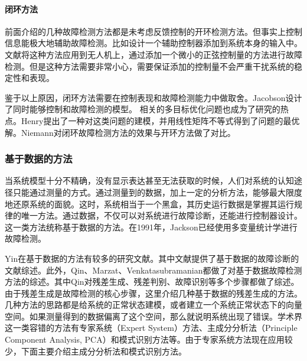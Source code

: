 \paragraph*{闭环方法}前面介绍的几种故障检测方法都是未考虑反馈控制的开环检测方法。但事实上控制信息能极大地辅助故障检测。比如设计一个辅助控制器添加到系统本身的输入中\cite{NIEMANN2006587,ASHARI2009192}。文献将这种方法应用到无人机上，通过添加一个微小的正弦控制量的方法进行故障检测。但是这种方法需要非常小心，需要保证添加的控制量不会严重干扰系统的稳定性和表现\cite{Niemann2006Active}。

鉴于以上原因，闭环方法需要在控制表现和故障检测能力中做取舍。Jacobson\cite{92987}设计了同时能够控制和故障检测的模型。 相关的多目标优化问题也成为了研究的热点。Henry\cite{Henry2005251}提出了一种对这类问题的建模，并用线性矩阵不等式得到了问题的最优解。Niemann\cite{649678}对闭环故障检测方法的效果与开环方法做了对比。

\subsubsection{基于数据的方法}\label{subsubsec:databased}
当系统模型十分不精确，没有显示表达甚至无法获取的时候，人们对系统的认知途径只能通过测量的方式。通过测量到的数据，加上一定的分析方法，能够最大限度地还原系统的面貌。这时，系统相当于一个黑盒，其历史运行数据是掌握其运行规律的唯一方法。通过数据，不仅可以对系统进行故障诊断，还能进行控制器设计。这一类方法统称基于数据的方法。在1991年，Jackson已经使用多变量统计学进行故障检测。

Yin在基于数据的方法有较多的研究文献\cite{6717991,7394158,7067026,6748057,7297846,7407616}。其中文献\cite{6717991,6748057,7407616}提供了基于数据的故障诊断的文献综述。此外，Qin\cite{Qin2012220}、Marzat\cite{Marzat2012modelbased}、Venkatasubramanian\cite{Venkatasubramanian2003327}都做了对基于数据故障检测方法的综述。其中Qin\cite{Qin2012220}对残差生成、残差判别、故障识别等多个步骤都做了综述。由于残差生成是故障检测的核心步骤，这里介绍几种基于数据的残差生成的方法。几种方法的思路都是给系统的正常状态建模，或者建立一个系统正常状态下的向量空间。如果测量得到的数据偏离了这个空间，那么就说明系统出现了错误。学术界这一类容错的方法有专家系统（Expert System）方法、主成分分析法（Principle Component Analysis, PCA）和模式识别方法等。由于专家系统方法现在应用较少，下面主要介绍主成分分析法和模式识别方法。


